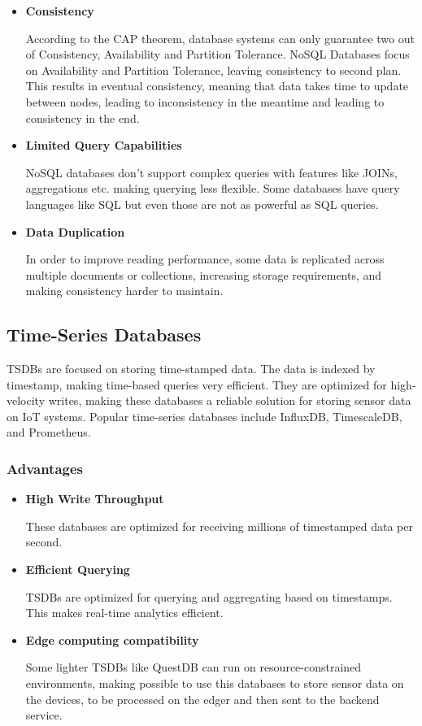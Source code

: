 \begin{itemize}
	\item \textbf{Consistency}

	      According to the \gls{CAP} theorem, database systems can only guarantee two out of
	      Consistency, Availability and Partition Tolerance. \gls{NoSQL} Databases focus on
	      Availability and Partition Tolerance, leaving consistency to second plan.
	      This results in eventual consistency, meaning that data takes time to update
	      between nodes, leading to inconsistency in the meantime and leading to
	      consistency in the end.

	\item \textbf{Limited Query Capabilities}

	      \gls{NoSQL} databases don't support complex queries with features like JOINs,
	      aggregations etc. making querying less flexible. Some databases have query
	      languages like \gls{SQL} but even those are not as powerful as \gls{SQL} queries.

	\item \textbf{Data Duplication}

	      In order to improve reading performance, some data is replicated across
	      multiple documents or collections, increasing storage requirements, and
	      making consistency harder to maintain.
\end{itemize}
\subsection{Time-Series Databases}
\gls{TSDB}s are focused on storing time-stamped data. The
data is indexed by timestamp, making time-based queries very efficient. They are
optimized for high-velocity writes, making these databases a reliable solution
for storing sensor data on \gls{IoT} systems. Popular time-series databases include
InfluxDB, TimescaleDB, and Prometheus.

\subsubsection{Advantages}
\begin{itemize}
	\item \textbf{High Write Throughput}

	      These databases are optimized for receiving millions of timestamped data
	      per second.

	\item \textbf{Efficient Querying}

	      \gls{TSDB}s are optimized for querying and aggregating based on timestamps. This
	      makes real-time analytics efficient.

	\item \textbf{Edge computing compatibility}

	      Some lighter \gls{TSDB}s like QuestDB can run on resource-constrained environments,
	      making possible to use this databases to store sensor data on the devices,
	      to be processed on the edger and then sent to the backend service.

\end{itemize}
